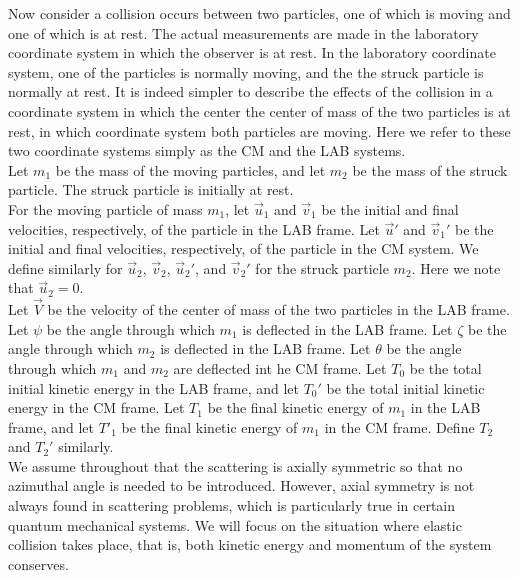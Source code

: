 \documentclass[11pt,oneside]{book}
\theoremstyle{break}
\theoremstyle{break}
\begin{document}
Now consider a collision occurs between two particles, one of which is moving and one of which is at rest. The actual measurements are made in the laboratory coordinate system in which the observer is at rest. In the laboratory coordinate system, one of the particles is normally moving, and the the struck particle is normally at rest. It is indeed simpler to describe the effects of the collision in a  coordinate system in which the center the center of mass of the two particles is at rest, in which coordinate system both particles are moving. Here we refer to these two coordinate systems simply as the CM and the LAB systems. \\

Let $m_1$ be the mass of the moving particles, and let $m_2$ be the mass of the struck particle. The struck particle is initially at rest.\\

For the moving particle of mass $m_1$, let $\vec{u}_1$ and $\vec{v}_1$ be the initial and final velocities, respectively, of the particle in the LAB frame. Let $\vec{u}'$ and $\vec{v}_1'$ be the initial and final velocities, respectively, of the particle in the CM system. We define similarly for $\vec{u}_2$, $\vec{v}_2$, $\vec{u}_2'$, and $\vec{v}_2'$ for the struck particle $m_2$. Here we note that $\vec{u}_2 = 0$. \\

Let $\vec{V}$ be the velocity of the center of mass of the two particles in the LAB frame. Let $\psi$ be the angle through which $m_1$ is deflected in the LAB frame. Let $\zeta$ be the angle through which $m_2$ is deflected in the LAB frame. Let $\theta$ be the angle through which $m_1$ and $m_2$ are deflected int he CM frame. Let $T_0$ be the total initial kinetic energy in the LAB frame, and let $T_0'$ be the total initial kinetic energy in the CM frame. Let $T_1$ be the final kinetic energy of $m_1$ in the LAB frame, and let $T'_1$ be the final kinetic energy of $m_1$ in the CM frame. Define $T_2$ and $T_2'$ similarly. \\

We assume throughout that the scattering is axially symmetric so that no azimuthal angle is needed to be introduced. However, axial symmetry is not always found in scattering problems, which is particularly true in certain quantum mechanical systems. We will focus on the situation where elastic collision takes place, that is, both kinetic energy and momentum of the system conserves.\\
\end{document}
